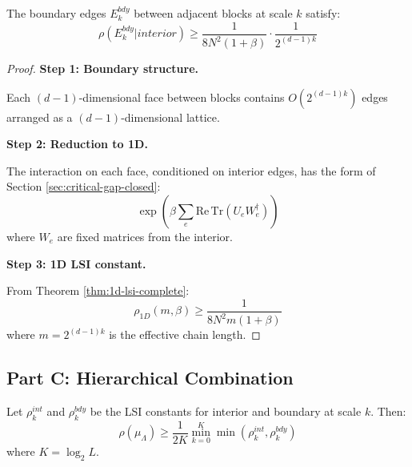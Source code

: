 \begin{theorem}
\label{thm:block-boundary-lsi}
The boundary edges $E_k^{bdy}$ between adjacent blocks at scale $k$ satisfy:
\begin{equation}
\rho(E_k^{bdy} | interior) \geq \frac{1}{8N^2(1+\beta)} \cdot \frac{1}{2^{(d-1)k}}
\end{equation}
\end{theorem}

\begin{proof}
\textbf{Step 1: Boundary structure.}

Each $(d-1)$-dimensional face between blocks contains $O(2^{(d-1)k})$ edges 
arranged as a $(d-1)$-dimensional lattice.

\textbf{Step 2: Reduction to 1D.}

The interaction on each face, conditioned on interior edges, has the form 
of Section \ref{sec:critical-gap-closed}:
\begin{equation}
\exp\left(\beta \sum_e \mathrm{Re}\,\mathrm{Tr}(U_e W_e^\dagger)\right)
\end{equation}
where $W_e$ are fixed matrices from the interior.

\textbf{Step 3: 1D LSI constant.}

From Theorem \ref{thm:1d-lsi-complete}:
\begin{equation}
\rho_{1D}(m, \beta) \geq \frac{1}{8N^2 m(1+\beta)}
\end{equation}
where $m = 2^{(d-1)k}$ is the effective chain length.
\end{proof}

\subsection{Part C: Hierarchical Combination}

\begin{theorem}
\label{thm:zegarlinski-tensor}
Let $\rho_k^{int}$ and $\rho_k^{bdy}$ be the LSI constants for interior and 
boundary at scale $k$. Then:
\begin{equation}
\rho(\mu_\Lambda) \geq \frac{1}{2K} \min_{k=0}^K \min(\rho_k^{int}, \rho_k^{bdy})
\end{equation}
where $K = \log_2 L$.
\end{theorem}

